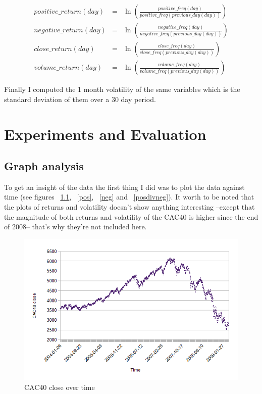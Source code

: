 \documentclass[12pt]{report}
\begin{document}
			\begin{eqnarray}
				positive\_return(day) &=& \ln\left(\frac{positive\_freq(day)}{positive\_freq(previous\_day(day))}\right)\label{preturn}\\
				negative\_return(day) &=& \ln\left(\frac{negative\_freq(day)}{negative\_freq(previous\_day(day))}\right)\label{nreturn}\\
				close\_return(day) &=& \ln\left(\frac{close\_freq(day)}{close\_freq(previous\_day(day))}\right)\label{creturn}\\
				volume\_return(day) &=& \ln\left(\frac{volume\_freq(day)}{volume\_freq(previous\_day(day))}\right)\label{vreturn}
			\end{eqnarray}
			
			Finally I computed the 1 month volatility of the same variables which is the standard deviation of them over a 30 day period.
			
	\chapter{Experiments and Evaluation}
		\section{Graph analysis}
		
			To get an insight of the data the first thing I did was to plot the data against time (see figures ~\ref{cac}, ~\ref{pos}, ~\ref{neg} and ~\ref{posdivneg}). It worth to be noted that the plots of returns and volatility doesn't show anything interesting --except that the magnitude of both returns and volatility of the CAC40 is higher since the end of 2008-- that's why they're not included here.

			\begin{figure}[h!]
				\caption{CAC40 close over time\label{cac}}
				\includegraphics{plots/time/cac.png}
			\end{figure}
\end{document}

